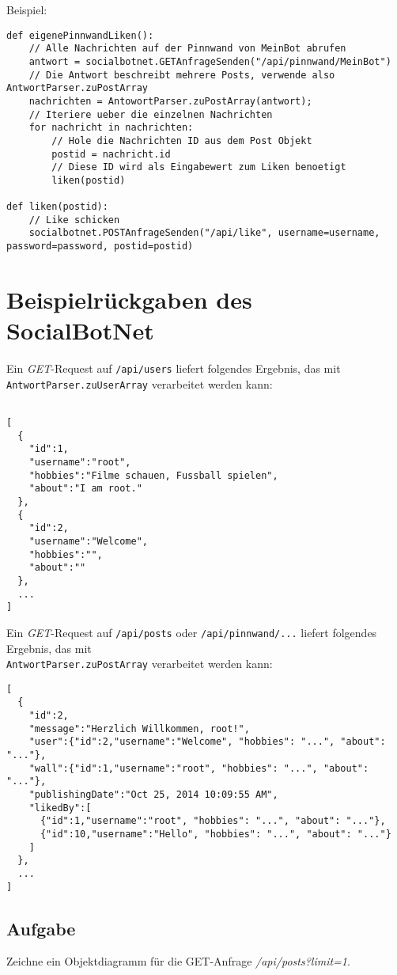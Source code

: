 \documentclass[parskip=half*]{scrartcl}
\begin{document}
Beispiel:
\begin{lstlisting}
def eigenePinnwandLiken():
    // Alle Nachrichten auf der Pinnwand von MeinBot abrufen
    antwort = socialbotnet.GETAnfrageSenden("/api/pinnwand/MeinBot")
    // Die Antwort beschreibt mehrere Posts, verwende also AntwortParser.zuPostArray
    nachrichten = AntowortParser.zuPostArray(antwort);
    // Iteriere ueber die einzelnen Nachrichten
    for nachricht in nachrichten:
        // Hole die Nachrichten ID aus dem Post Objekt
        postid = nachricht.id
        // Diese ID wird als Eingabewert zum Liken benoetigt
        liken(postid)

def liken(postid):
    // Like schicken
    socialbotnet.POSTAnfrageSenden("/api/like", username=username, password=password, postid=postid)
\end{lstlisting}

\newpage
\section*{Beispielrückgaben des SocialBotNet}

Ein \emph{GET}-Request auf \lstinline{/api/users} liefert folgendes Ergebnis, das mit \lstinline{AntwortParser.zuUserArray} verarbeitet werden kann:
\begin{lstlisting}

[
  {
    "id":1,
    "username":"root",
    "hobbies":"Filme schauen, Fussball spielen",
    "about":"I am root."
  },
  {
    "id":2,
    "username":"Welcome",
    "hobbies":"",
    "about":""
  },
  ...
]
\end{lstlisting}


Ein \emph{GET}-Request auf \lstinline{/api/posts} oder \lstinline{/api/pinnwand/...} liefert folgendes Ergebnis, das mit \\\lstinline{AntwortParser.zuPostArray} verarbeitet werden kann:
\begin{lstlisting}
[
  {
    "id":2,
    "message":"Herzlich Willkommen, root!",
    "user":{"id":2,"username":"Welcome", "hobbies": "...", "about": "..."},
    "wall":{"id":1,"username":"root", "hobbies": "...", "about": "..."},
    "publishingDate":"Oct 25, 2014 10:09:55 AM",
    "likedBy":[
      {"id":1,"username":"root", "hobbies": "...", "about": "..."},
      {"id":10,"username":"Hello", "hobbies": "...", "about": "..."}
    ]
  },
  ...
]
\end{lstlisting}

\subsection*{Aufgabe} Zeichne ein Objektdiagramm für die GET-Anfrage \emph{/api/posts?limit=1}.
\end{document}
